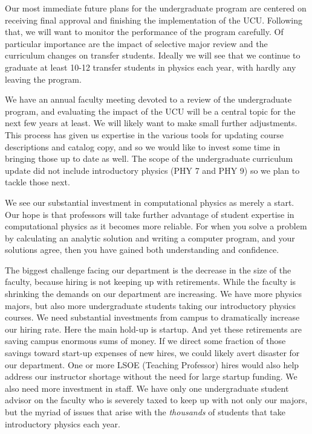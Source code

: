 \documentclass[12pt]{article}
\begin{document}
Our most immediate future plans for the undergraduate program are
centered on receiving final approval and finishing the implementation
of the UCU.  Following that, we will want to monitor the performance
of the program carefully.  Of particular importance are the impact of
selective major review and the curriculum changes on transfer
students.  Ideally we will see that we continue to graduate at least
10-12 transfer students in physics each year, with hardly any leaving
the program.

We have an annual faculty meeting devoted to a review of the
undergraduate program, and evaluating the impact of the UCU will be a
central topic for the next few years at least.  We will likely want to
make small further adjustments.  This process has given us expertise
in the various tools for updating course descriptions and catalog
copy, and so we would like to invest some time in bringing those up to
date as well.  The scope of the undergraduate curriculum update did
not include introductory physics (PHY 7 and PHY 9) so we plan to
tackle those next.

We see our substantial investment in computational physics as merely a
start.  Our hope is that professors will take further advantage of
student expertise in computational physics as it becomes more
reliable.  For when you solve a problem by calculating an analytic solution and writing
a computer program, and your solutions agree, then you have gained both
understanding and confidence.

The biggest challenge facing our department is the decrease in the
size of the faculty, because hiring is not keeping up with
retirements.  While the faculty is shrinking the demands on our
department are increasing.  We have more physics majors, but also more
undergraduate students taking our introductory physics courses.  We
need substantial investments from campus to dramatically increase our
hiring rate.  Here the main hold-up is startup.  And yet these
retirements are saving campus enormous sums of money.  If we direct
some fraction of those savings toward start-up expenses of new hires,
we could likely avert disaster for our department.  One or more LSOE
(Teaching Professor) hires would also help address our instructor
shortage without the need for large startup funding.  We also need more
investment in staff.  We have only one undergraduate student advisor
on the faculty who is severely taxed to keep up with not only our
majors, but the myriad of issues that arise with the {\em thousands}
of students that take introductory physics each year.
\end{document}
